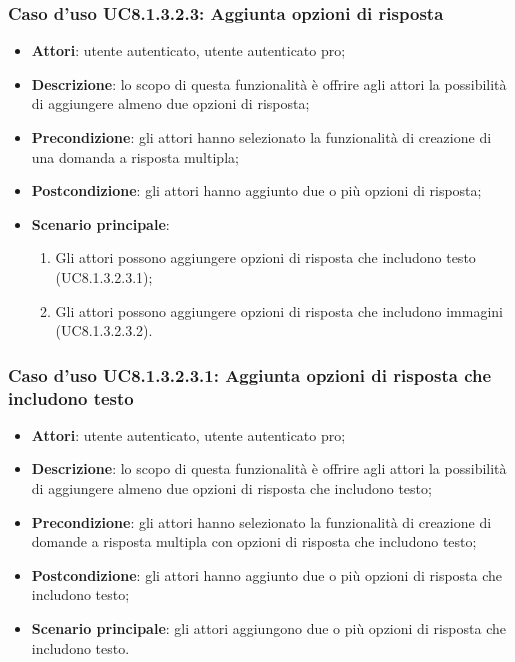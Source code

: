 \subsubsection{Caso d'uso UC8.1.3.2.3: Aggiunta opzioni di risposta}
	\begin{itemize}
		\item
			\textbf{Attori}: utente autenticato, utente autenticato pro;
		\item		
			\textbf{Descrizione}: lo scopo di questa funzionalità è offrire agli attori la possibilità di aggiungere almeno due opzioni di risposta;
		\item
			\textbf{Precondizione}: gli attori hanno selezionato la funzionalità di creazione di una domanda a risposta multipla; 
		\item
			\textbf{Postcondizione}: gli attori hanno aggiunto due o più opzioni di risposta;
		\item
			\textbf{Scenario principale}:
	       		\begin{enumerate}
	       			\item
	       			Gli attori possono aggiungere opzioni di risposta che includono testo (UC8.1.3.2.3.1);
					\item
					Gli attori possono aggiungere opzioni di risposta che includono immagini (UC8.1.3.2.3.2).
	 			\end{enumerate}
	\end{itemize}	
	
\subsubsection{Caso d'uso UC8.1.3.2.3.1: Aggiunta opzioni di risposta che includono testo}
	\begin{itemize}
		\item
			\textbf{Attori}: utente autenticato, utente autenticato pro;
		\item		
			\textbf{Descrizione}: lo scopo di questa funzionalità è offrire agli attori la possibilità di aggiungere almeno due opzioni di risposta che includono testo;
		\item
			\textbf{Precondizione}: gli attori hanno selezionato la funzionalità di creazione di domande a risposta multipla con opzioni di risposta che includono testo; 
		\item
			\textbf{Postcondizione}: gli attori hanno aggiunto due o più opzioni di risposta che includono testo;
		\item
			\textbf{Scenario principale}: gli attori aggiungono due o più opzioni di risposta che includono testo. 			
	\end{itemize}	
	
